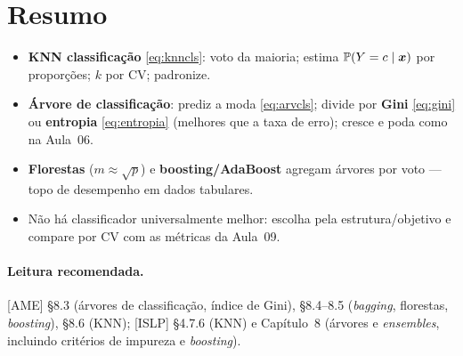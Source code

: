 \documentclass[11pt,a4paper]{article}
\begin{document}
\section*{Resumo}
\begin{itemize}[leftmargin=1.4cm]
  \item \textbf{KNN classificação} \eqref{eq:knncls}: voto da maioria; estima
        $\mathbb{P}(Y=c\mid\bm{x})$ por proporções; $k$ por CV; padronize.
  \item \textbf{Árvore de classificação}: prediz a moda \eqref{eq:arvcls}; divide
        por \textbf{Gini} \eqref{eq:gini} ou \textbf{entropia} \eqref{eq:entropia}
        (melhores que a taxa de erro); cresce e poda como na Aula~06.
  \item \textbf{Florestas} ($m\approx\sqrt p$) e \textbf{boosting/AdaBoost} agregam
        árvores por voto --- topo de desempenho em dados tabulares.
  \item Não há classificador universalmente melhor: escolha pela estrutura/objetivo
        e compare por CV com as métricas da Aula~09.
\end{itemize}

\paragraph{Leitura recomendada.} [AME] §8.3 (árvores de classificação, índice de
Gini), §8.4--8.5 (\emph{bagging}, florestas, \emph{boosting}), §8.6 (KNN); [ISLP]
§4.7.6 (KNN) e Capítulo~8 (árvores e \emph{ensembles}, incluindo critérios de
impureza e \emph{boosting}).
\end{document}
